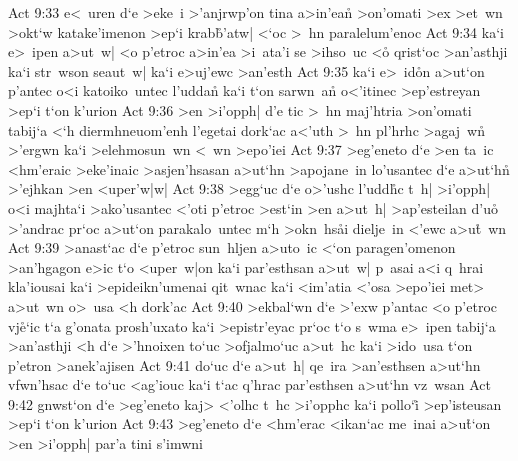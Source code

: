 \vs Act 9:33
e<~uren
d`e
>eke~i
>'anjrwp'on
tina
a>in'ean\r{}
>on'omati
>ex
>et~wn
>okt`w
katake'imenon
>ep`i
krab\r{b}'atw|
<`oc
>~hn
paralelum'enoc\bibvsend
\vs Act 9:34
ka`i
e>~ipen
a>ut~w|
<o
p'etroc
a>in'ea
>i~ata'i
se
>ihso~uc
<o\r{}
qrist`oc
>an'asthji
ka`i
str~wson
seaut~w|
ka`i
e>uj'ewc
>an'esth\bibvsend
\vs Act 9:35
ka`i
e>~id\r{o}n
a>ut`on
p'antec
o<i
katoiko~untec
l'udda\r{n}
ka`i
t`on
sarwn~a\r{n}
o<'itinec
>ep'estreyan
>ep`i
t`on
k'urion\bibvsend
\vs Act 9:36
>en
>i'opph|
d'e
tic
>~hn
maj'htria
>on'omati
tabij`a
<`h
diermhneuom'enh
l'egetai
dork`ac
a<'uth
>~hn
pl'hrhc
>agaj~wn\r{}
>'ergwn
ka`i
>elehmosun~wn
<~wn
>epo'iei\bibvsend
\vs Act 9:37
>eg'eneto
d`e
>en
ta~ic
<hm'eraic
>eke'inaic
>asjen'hsasan
a>ut`hn
>apojane~in
lo'usantec
d`e
a>ut`hn\r{}
>'ejhkan
>en
<uper'w|w|\bibvsend
\vs Act 9:38
>egg`uc
d`e
o>'ushc
l'udd\r{h}c
t~h|
>i'opph|
o<i
majhta`i
>ako'usantec
<'oti
p'etroc
>est`in
>en
a>ut~h|
>ap'esteilan
d'uo\r{}
>'andrac
pr`oc
a>ut`on
parakalo~untec
m`h
>okn~hs\r{a}i
dielje~in
<'ewc
a>u\r{t}~wn\bibvsend
{}
\vs Act 9:39
>anast`ac
d`e
p'etroc
sun~hljen
a>uto~ic
<`on
paragen'omenon
>an'hgagon
e>ic
t`o
<uper~w|on
ka`i
par'esthsan
a>ut~w|
p~asai
a<i
q~hrai
kla'iousai
ka`i
>epideikn'umenai
qit~wnac
ka`i
<im'atia
<'osa
>epo'iei
met>
a>ut~wn
o>~usa
<h
dork'ac\bibvsend
\vs Act 9:40
>ekbal`wn
d`e
>'exw
p'antac
<o
p'etroc
vj\r{e}`ic
t`a
g'onata
prosh'uxato
ka`i
>epistr'eyac
pr`oc
t`o
s~wma
e>~ipen
tabij`a
>an'asthji
<h
d`e
>'hnoixen
to`uc
>ofjalmo`uc
a>ut~hc
ka`i
>ido~usa
t`on
p'etron
>anek'ajisen\bibvsend
\vs Act 9:41
do`uc
d`e
a>ut~h|
qe~ira
>an'esthsen
a>ut`hn
vfwn'hsac
d`e
to`uc
<ag'iouc
ka`i
t`ac
q'hrac
par'esthsen
a>ut`hn
vz~wsan\bibvsend
\vs Act 9:42
gnwst`on
d`e
>eg'eneto
kaj>
<'olhc
t~hc
>i'opphc
ka`i
pollo`i\r{}
>ep'isteusan
>ep`i
t`on
k'urion\bibvsend
\vs Act 9:43
>eg'eneto
d`e
<hm'erac
<ikan`ac
me~inai
a>u\r{t}`on
>en
>i'opph|
par'a
tini
s'imwni
